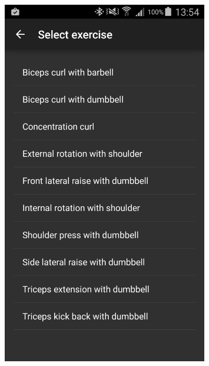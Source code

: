 \begin{figure}[t!]
\begin{minipage}{0.25\textwidth}
        \includegraphics[width=0.80\textwidth]{00_resources/figures/Android_Phone_ListView.png}
    \end{minipage}
    \begin{minipage}{0.25\textwidth}
      \centering

\end{minipage}
\end{figure}
